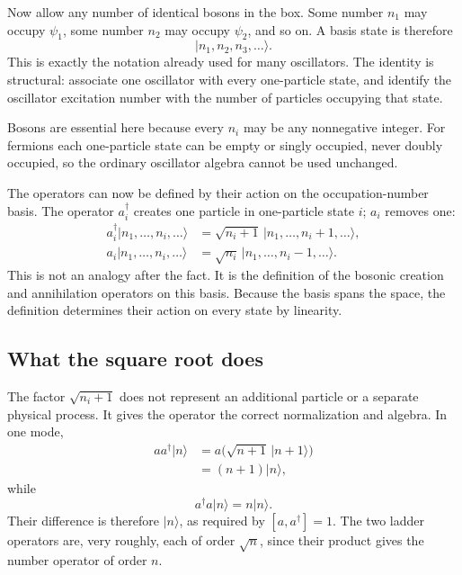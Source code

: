 Now allow any number of identical bosons in the box. Some number \(n_1\) may occupy \(\psi_1\), some number \(n_2\) may occupy \(\psi_2\), and so on. A basis state is therefore
\begin{equation}
|n_1,n_2,n_3,\ldots\rangle.
\end{equation}
This is exactly the notation already used for many oscillators. The identity is structural: associate one oscillator with every one-particle state, and identify the oscillator excitation number with the number of particles occupying that state.

Bosons are essential here because every \(n_i\) may be any nonnegative integer. For fermions each one-particle state can be empty or singly occupied, never doubly occupied, so the ordinary oscillator algebra cannot be used unchanged.

The operators can now be defined by their action on the occupation-number basis. The operator \(a_i^\dagger\) creates one particle in one-particle state \(i\); \(a_i\) removes one:
\begin{align}
a_i^\dagger|n_1,\ldots,n_i,\ldots\rangle
&=\sqrt{n_i+1}\,|n_1,\ldots,n_i+1,\ldots\rangle, \\
a_i|n_1,\ldots,n_i,\ldots\rangle
&=\sqrt{n_i}\,|n_1,\ldots,n_i-1,\ldots\rangle.
\end{align}
This is not an analogy after the fact. It is the definition of the bosonic creation and annihilation operators on this basis. Because the basis spans the space, the definition determines their action on every state by linearity.

\begin{classroomqa}
\end{classroomqa}

\subsection{What the square root does}

The factor \(\sqrt{n_i+1}\) does not represent an additional particle or a separate physical process. It gives the operator the correct normalization and algebra. In one mode,
\begin{align}
a a^\dagger|n\rangle
&=a\bigl(\sqrt{n+1}\,|n+1\rangle\bigr) \\
&=(n+1)|n\rangle,
\end{align}
while
\begin{equation}
a^\dagger a|n\rangle=n|n\rangle.
\end{equation}
Their difference is therefore \(|n\rangle\), as required by \([a,a^\dagger]=1\). The two ladder operators are, very roughly, each of order \(\sqrt n\), since their product gives the number operator of order \(n\).

